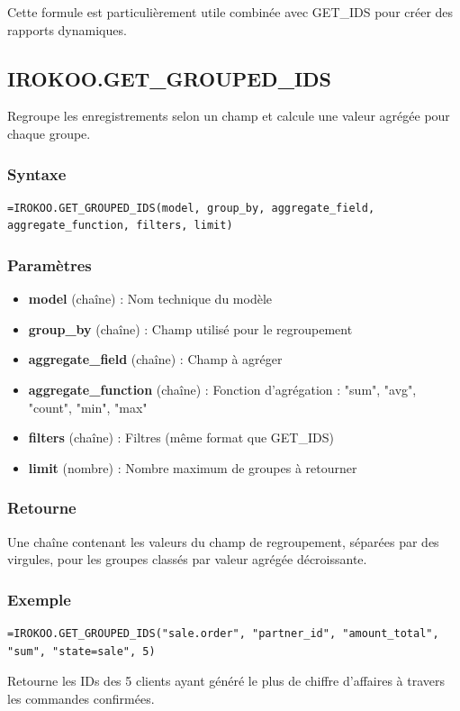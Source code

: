 \documentclass[12pt, a4paper]{article}
\begin{document}
\begin{note}
Cette formule est particulièrement utile combinée avec GET\_IDS pour créer des rapports dynamiques.
\end{note}

\subsection{IROKOO.GET\_GROUPED\_IDS}
\begin{tcolorbox}[title=Description]
Regroupe les enregistrements selon un champ et calcule une valeur agrégée pour chaque groupe.
\end{tcolorbox}

\subsubsection{Syntaxe}
\begin{lstlisting}
=IROKOO.GET_GROUPED_IDS(model, group_by, aggregate_field, aggregate_function, filters, limit)
\end{lstlisting}

\subsubsection{Paramètres}
\begin{itemize}
    \item \textbf{model} (chaîne) : Nom technique du modèle
    \item \textbf{group\_by} (chaîne) : Champ utilisé pour le regroupement
    \item \textbf{aggregate\_field} (chaîne) : Champ à agréger
    \item \textbf{aggregate\_function} (chaîne) : Fonction d'agrégation : "sum", "avg", "count", "min", "max"
    \item \textbf{filters} (chaîne) : Filtres (même format que GET\_IDS)
    \item \textbf{limit} (nombre) : Nombre maximum de groupes à retourner
\end{itemize}

\subsubsection{Retourne}
Une chaîne contenant les valeurs du champ de regroupement, séparées par des virgules, pour les groupes classés par valeur agrégée décroissante.

\subsubsection{Exemple}
\begin{lstlisting}
=IROKOO.GET_GROUPED_IDS("sale.order", "partner_id", "amount_total", "sum", "state=sale", 5)
\end{lstlisting}
Retourne les IDs des 5 clients ayant généré le plus de chiffre d'affaires à travers les commandes confirmées.
\end{document}

